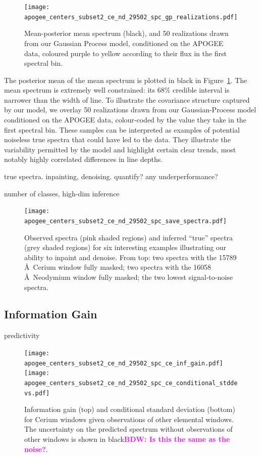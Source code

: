 \documentclass[a4paper,fleqn,usenatbib]{mnras}
\newcommand{\bdw}[1]{\textbf{\textcolor{magenta}{BDW: #1}}}
\begin{document}
\begin{figure}
	\texttt{[image: apogee\_centers\_subset2\_ce\_nd\_29502\_spc\_gp\_realizations.pdf]}
    \caption{Mean-posterior mean spectrum (black), and 50 realizations drawn from our Gaussian Process model, conditioned on the APOGEE data, coloured purple to yellow according to their flux in the first spectral bin.}
    \label{fig:gp_reals}
\end{figure}

The posterior mean of the mean spectrum is plotted in black in Figure~\ref{fig:gp_reals}. The mean spectrum is extremely well constrained: its 68\% credible interval is narrower than the width of line. To illustrate the covariance structure captured by our model, we overlay 50 realizations drawn from our Gaussian-Process model conditioned on the APOGEE data, colour-coded by the value they take in the first spectral bin. These samples can be interpreted as examples of potential noiseless true spectra that could have led to the data. They illustrate the variability permitted by the model and highlight certain clear trends, most notably highly correlated differences in line depths.

true spectra. inpainting, denoising. quantify? any underperformance?

number of classes, high-dim inference

\begin{figure}
	\texttt{[image: apogee\_centers\_subset2\_ce\_nd\_29502\_spc\_save\_spectra.pdf]}
    \caption{Observed spectra (pink shaded regions) and inferred ``true'' spectra (grey shaded regions) for six interesting examples illustrating our ability to inpaint and denoise. From top: two spectra with the 15789 \AA\ Cerium window fully masked; two spectra with the 16058 \AA\ Neodymium window fully masked; the two lowest signal-to-noise spectra.}
    \label{fig:inpainting_denoising_examples}
\end{figure}

\subsection{Information Gain}

predictivity

\begin{figure}
	\texttt{[image: apogee\_centers\_subset2\_ce\_nd\_29502\_spc\_ce\_inf\_gain.pdf]}
	\texttt{[image: apogee\_centers\_subset2\_ce\_nd\_29502\_spc\_ce\_conditional\_stddevs.pdf]}
    \caption{Information gain (top) and conditional standard deviation (bottom) for Cerium windows given observations of other elemental windows. The uncertainty on the predicted spectrum without observations of other windows is shown in black\bdw{Is this the same as the noise?}.}
    \label{fig:ce_information}
\end{figure}
\end{document}
